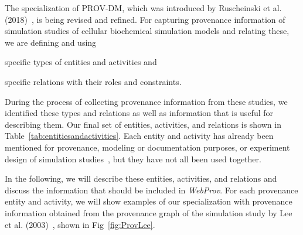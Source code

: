 \documentclass[10pt,letterpaper]{article}
\newcommand{\webprov}{\textit{WebProv}}
\newcommand{\lee}{Lee et al. (2003)}
\begin{document}
The specialization of PROV-DM, which was introduced by Ruscheinski et al. (2018)~\cite{Ruscheinski2018}, is being revised and refined.
For capturing provenance information of simulation studies of cellular biochemical simulation models and relating these, we are defining and using
\begin{inparaenum}[a)]
\item specific types of entities and activities and
\item specific relations with their roles and constraints.
\end{inparaenum}
During the process of collecting provenance information from these studies, we identified these types and relations as well as information that is useful for describing them.
Our final set of entities, activities, and relations is shown in Table~\ref{tab:entitiesandactivities}.
Each entity and activity has already been mentioned for provenance, modeling or documentation purposes, or experiment design of simulation studies~\cite{Ruscheinski2017, Balci2012, Yilmaz2016, Monks2018, Bergmann2014, Carusi2012, Erdemir2012, Lorig2017, Ruscheinski2018, Waltemath2011, Wilsdorf2020b}, but they have not all been used together.

In the following, we will describe these entities, activities, and relations and discuss the information that should be included in \webprov{}.
For each provenance entity and activity, we will show examples of our specialization with provenance information obtained from the provenance graph of the simulation study by \lee{}~\cite{Lee2003}, shown in Fig~\ref{fig:ProvLee}.
\end{document}
